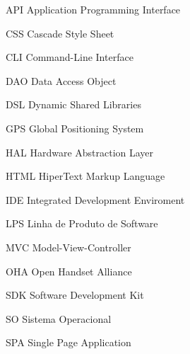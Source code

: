 \begin{siglas}
  
  \item[API] Application Programming Interface
  \item[CSS] Cascade Style Sheet
  \item[CLI] Command-Line Interface
  \item[DAO] Data Access Object
  \item[DSL] Dynamic Shared Libraries
  \item[GPS] Global Positioning System
  \item[HAL] Hardware Abstraction Layer
  \item[HTML] HiperText Markup Language
  \item[IDE] Integrated Development Enviroment
  \item[LPS] Linha de Produto de Software
  \item[MVC] Model-View-Controller
  \item[OHA] Open Handset Alliance
  \item[SDK] Software Development Kit
  \item[SO] Sistema Operacional
  \item[SPA] Single Page Application
    
\end{siglas}
